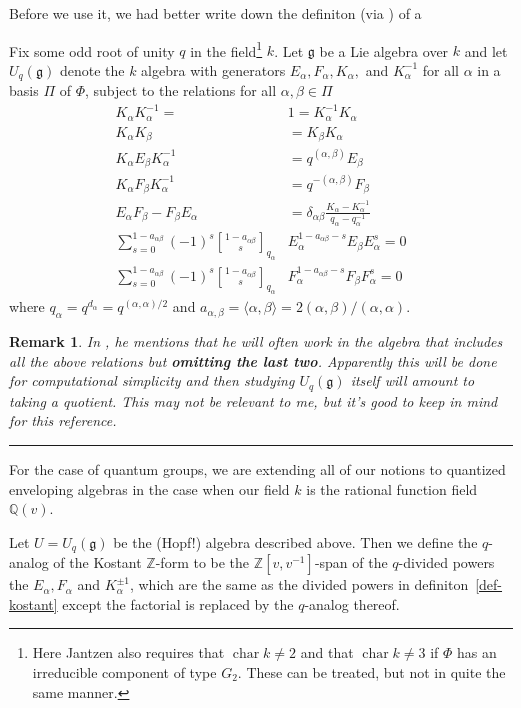 \documentclass[12pt]{article}
\theoremstyle{nonumberbreak}
\theoremstyle{changebreak}
\theoremstyle{nonumberplain}
\theoremstyle{change}
\newtheorem{rmk}[thm]{Remark}
\newcommand*{\bbZ}{\mathbb{Z}}
\newcommand*{\bbQ}{\mathbb{Q}}
\newcommand*{\g}{\mathfrak{g}}
\DeclareMathOperator{\ch}{char}
\DeclareRobustCommand{\sqbinom}{\genfrac[]{0pt}{}}
\newcommand*{\brk}{
\rule{2in}{.1pt}
}
\begin{document}
Before we use it, we had better write down the definiton (via \cite{janzten-quantum}) of a
\begin{defn}
	Fix some odd root of unity $q$ in the field\footnote{Here Jantzen also requires that $\ch k\ne2$ and that $\ch k\ne3$ if $\Phi$ has an irreducible component of type $G_2$. These can be treated, but not in quite the same manner.} $k$. 
	Let $\g$ be a Lie algebra over $k$ and let $U_q(\g)$ denote the $k$ algebra with generators $E_\alpha,F_\alpha, K_\alpha,$ and $K_\alpha^{-1}$
	for all $\alpha$ in a basis $\Pi$ of $\Phi$, subject to the relations for all $\alpha,\beta\in\Pi$
	\begin{align*}
		K_\alpha K_\alpha^{-1}=&1=K^{-1}_\alpha K_\alpha\\
		K_\alpha K_\beta &= K_\beta K_\alpha\\
		K_\alpha E_\beta K_\alpha^{-1} &= q^{(\alpha,\beta)}E_\beta\\
		K_\alpha F_\beta K_\alpha^{-1} &= q^{-(\alpha,\beta)}F_\beta\\
		E_\alpha F_\beta - F_\beta E_\alpha &= \delta_{\alpha\beta}\frac{K_\alpha-K_\alpha^{-1}}{q_\alpha-q_\alpha^{-1}}\\
		\sum_{s=0}^{1-a_{\alpha\beta}}(-1)^s\sqbinom{1-a_{\alpha\beta}}{s}_{q_\alpha} &E_\alpha^{1-a_{\alpha\beta}-s}E_\beta E_\alpha^s = 0\\
		\sum_{s=0}^{1-a_{\alpha\beta}}(-1)^s\sqbinom{1-a_{\alpha\beta}}{s}_{q_\alpha} &F_\alpha^{1-a_{\alpha\beta}-s}F_\beta F_\alpha^s = 0
	\end{align*}
	where $q_\alpha=q^{d_\alpha}=q^{(\alpha,\alpha)/2}$ and $a_{\alpha,\beta}=\langle\alpha,\beta\rangle=2(\alpha,\beta)/(\alpha,\alpha)$.
\end{defn}

\begin{rmk}
	In \cite{janzten-quantum}, he mentions that he will often work in the algebra that includes all the above relations
	but \textbf{omitting the last two}. Apparently this will be done for computational simplicity and then studying $U_q(\g)$ 
	itself will amount to taking a quotient. This may not be relevant to me, but it's good to keep in mind for this reference.
\end{rmk}

\brk

For the case of quantum groups, we are extending all of our notions to quantized enveloping algebras in the case when our field $k$ is the rational function field
$\bbQ(v)$.
\begin{defn}[$q$-analog of the Kostant $\bbZ$-form]
	Let $U=U_q(\g)$ be the (Hopf!) algebra described above. Then we define the $q$-analog of the Kostant $\bbZ$-form
	to be the $\bbZ[v,v^{-1}]$-span of the $q$-divided powers the $E_\alpha,F_\alpha$ and $K_\alpha^{\pm 1}$, which are the same as
	the divided powers in definiton~\ref{def-kostant} except the factorial is replaced by the $q$-analog thereof.
\end{defn}
\end{document}
